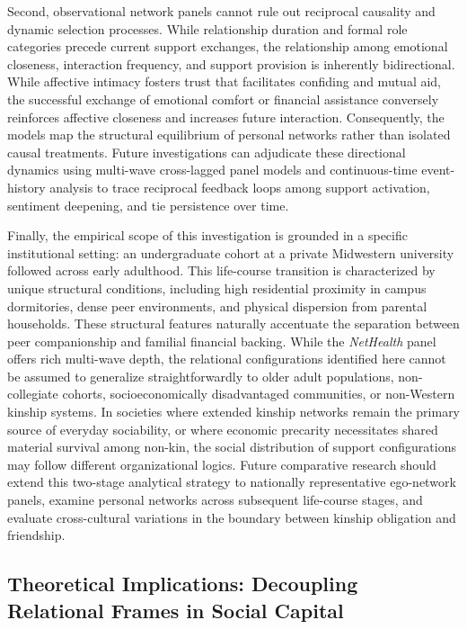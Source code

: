 \documentclass[12pt]{article}
\begin{document}
Second, observational network panels cannot rule out reciprocal causality and dynamic selection processes. While relationship duration and formal role categories precede current support exchanges, the relationship among emotional closeness, interaction frequency, and support provision is inherently bidirectional. While affective intimacy fosters trust that facilitates confiding and mutual aid, the successful exchange of emotional comfort or financial assistance conversely reinforces affective closeness and increases future interaction. Consequently, the models map the structural equilibrium of personal networks rather than isolated causal treatments. Future investigations can adjudicate these directional dynamics using multi-wave cross-lagged panel models and continuous-time event-history analysis to trace reciprocal feedback loops among support activation, sentiment deepening, and tie persistence over time.

Finally, the empirical scope of this investigation is grounded in a specific institutional setting: an undergraduate cohort at a private Midwestern university followed across early adulthood. This life-course transition is characterized by unique structural conditions, including high residential proximity in campus dormitories, dense peer environments, and physical dispersion from parental households. These structural features naturally accentuate the separation between peer companionship and familial financial backing. While the \textit{NetHealth} panel offers rich multi-wave depth, the relational configurations identified here cannot be assumed to generalize straightforwardly to older adult populations, non-collegiate cohorts, socioeconomically disadvantaged communities, or non-Western kinship systems. In societies where extended kinship networks remain the primary source of everyday sociability, or where economic precarity necessitates shared material survival among non-kin, the social distribution of support configurations may follow different organizational logics. Future comparative research should extend this two-stage analytical strategy to nationally representative ego-network panels, examine personal networks across subsequent life-course stages, and evaluate cross-cultural variations in the boundary between kinship obligation and friendship.

\subsection{Theoretical Implications: Decoupling Relational Frames in Social Capital}
\end{document}
